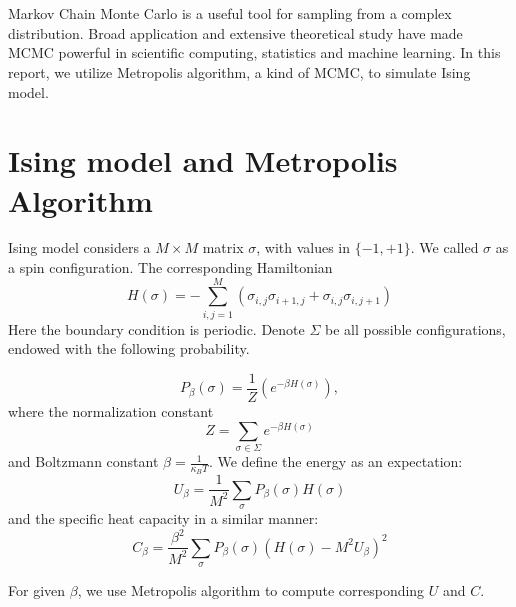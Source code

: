 \documentclass{article}
\begin{document}
	\maketitle
	\thispagestyle{fancy}
	\tableofcontents
	
	\section*{}


Markov Chain Monte Carlo is a useful tool for sampling from a complex distribution. Broad application and extensive theoretical study have made MCMC powerful in scientific computing, statistics and machine learning. In this report, we utilize Metropolis algorithm, a kind of MCMC, to simulate Ising model.

\section{Ising model and Metropolis Algorithm}

Ising model considers a $M \times M$ matrix $\sigma$, with values in $\{-1,+1\}$. We called $\sigma$ as a spin configuration. The corresponding Hamiltonian 
$$H(\sigma) = -\sum_{i,j=1}^M(\sigma_{i,j}\sigma_{i+1,j}+\sigma_{i,j}\sigma_{i,j+1})$$
Here the boundary condition is periodic. 
Denote $\Sigma$ be all possible configurations, endowed with the following probability.

\begin{equation}
P_\beta(\sigma) = \frac 1Z(e^{-\beta H(\sigma)}),
\end{equation}
where  the normalization constant
\begin{equation}
Z = \sum_{\sigma \in \Sigma}e^{-\beta H(\sigma)}
\end{equation}
and Boltzmann constant  $\beta=\frac{1}{\kappa_BT}$.
We define the energy as an expectation:
\begin{equation}
U_\beta  = \frac{1}{M^2}\sum_\sigma P_\beta(\sigma) H(\sigma)
\end{equation}
and the specific heat capacity in a similar manner:
\begin{equation}
C_\beta = \frac{\beta^2}{M^2} \sum_\sigma P_\beta(\sigma) (H(\sigma)-M^2U_\beta)^2
\end{equation}

For given $\beta$, we use Metropolis algorithm to compute corresponding $U$ and $C$. 
\end{document}
